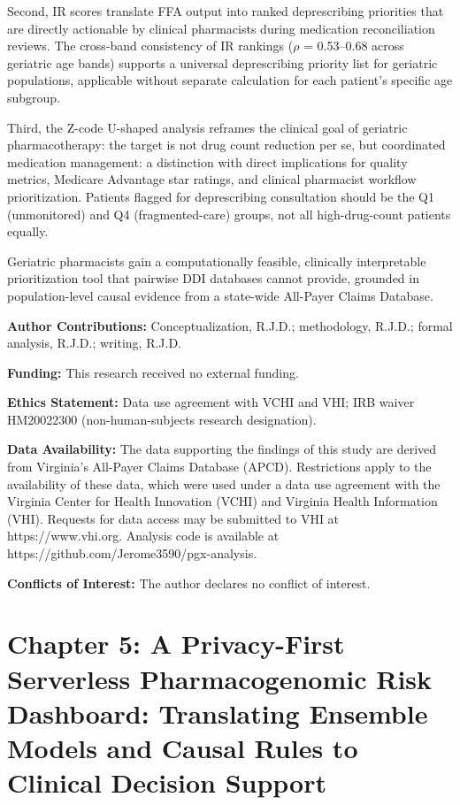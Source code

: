 \documentclass[
  12pt,
]{book}
\begin{document}
Second, IR scores translate FFA output into ranked deprescribing
priorities that are directly actionable by clinical pharmacists during
medication reconciliation reviews. The cross-band consistency of IR
rankings (\(\rho\) = 0.53--0.68 across geriatric age bands) supports a
universal deprescribing priority list for geriatric populations,
applicable without separate calculation for each patient's specific age
subgroup.

Third, the Z-code U-shaped analysis reframes the clinical goal of
geriatric pharmacotherapy: the target is not drug count reduction per
se, but coordinated medication management: a distinction with direct
implications for quality metrics, Medicare Advantage star ratings, and
clinical pharmacist workflow prioritization. Patients flagged for
deprescribing consultation should be the Q1 (unmonitored) and Q4
(fragmented-care) groups, not all high-drug-count patients equally.

Geriatric pharmacists gain a computationally feasible, clinically
interpretable prioritization tool that pairwise DDI databases cannot
provide, grounded in population-level causal evidence from a state-wide
All-Payer Claims Database.

\textbf{Author Contributions:} Conceptualization, R.J.D.; methodology,
R.J.D.; formal analysis, R.J.D.; writing, R.J.D.

\textbf{Funding:} This research received no external funding.

\textbf{Ethics Statement:} Data use agreement with VCHI and VHI; IRB
waiver HM20022300 (non-human-subjects research designation).

\textbf{Data Availability:} The data supporting the findings of this
study are derived from Virginia's All-Payer Claims Database (APCD).
Restrictions apply to the availability of these data, which were used
under a data use agreement with the Virginia Center for Health
Innovation (VCHI) and Virginia Health Information (VHI). Requests for
data access may be submitted to VHI at https://www.vhi.org. Analysis
code is available at https://github.com/Jerome3590/pgx-analysis.

\textbf{Conflicts of Interest:} The author declares no conflict of
interest.

\cleardoublepage

\chapter{Chapter 5: A Privacy-First Serverless Pharmacogenomic Risk
Dashboard: Translating Ensemble Models and Causal Rules to Clinical
Decision Support}\label{chap-5}
\end{document}
